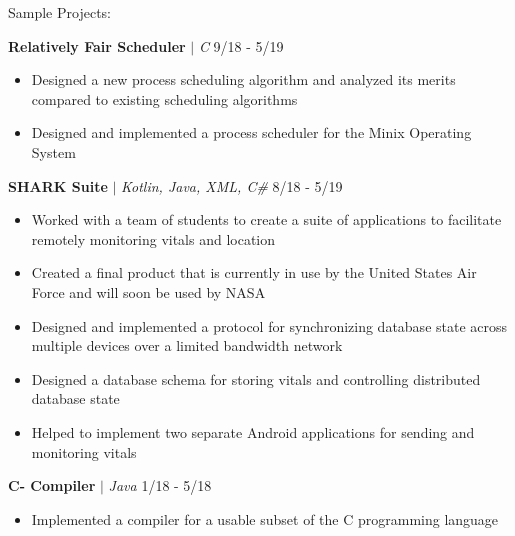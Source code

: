 \documentclass{article}
\newcommand{\project}[3]{\textbf{#1} $|$ \textit{#2} \hfill #3}
\newcommand{\makeListInner}[1]{\begin{itemize}[noitemsep,topsep=0pt] #1 \end{itemize}}
\newcommand{\makeList}[1]{\makeListInner{#1} \medskip}
\begin{document}
	Sample Projects: \medskip

	\project{Relatively Fair Scheduler}{C}{9/18 - 5/19} \makeList{
		\item Designed a new process scheduling algorithm and analyzed its merits compared to
		existing scheduling algorithms
		\item Designed and implemented a process scheduler for the Minix Operating System
	}

	\project{SHARK Suite}{Kotlin, Java, XML, C\#}{8/18 - 5/19} \makeList{
		\item Worked with a team of students to create a suite of applications to facilitate
		remotely monitoring vitals and location
		\item Created a final product that is currently in use by the United States Air Force and
		will soon be used by NASA
		\item Designed and implemented a protocol for synchronizing database state across multiple
		devices over a limited bandwidth network
		\item Designed a database schema for storing vitals and controlling distributed database
		state
		\item Helped to implement two separate Android applications for sending and monitoring
		vitals
	}

	\project{C- Compiler}{Java}{1/18 - 5/18} \makeList{
		\item Implemented a compiler for a usable subset of the C programming language
	}
\end{document}
